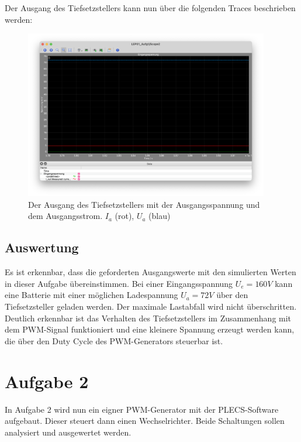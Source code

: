 \documentclass{report}
\begin{document}
Der Ausgang des Tiefsetzstellers kann nun über die folgenden Traces beschrieben werden:

\begin{figure}[hbt!]
	\begin{center}
		\includegraphics[width=0.95\textwidth]{assets/img/aufg1_ausgang.png}
	\end{center}
	\caption{Der Ausgang des Tiefsetzstellers mit der Ausgangsspannung und dem Ausgangsstrom. $I_a$ (rot), $U_a$ (blau)}
	\label{fig:aufg1_ausgang}
\end{figure}

\subsection{Auswertung}

Es ist erkennbar, dass die geforderten Ausgangswerte mit den simulierten Werten in dieser Aufgabe übereinstimmen. Bei einer Eingangsspannung $U_e = 160V$ kann eine Batterie mit einer möglichen Ladespannung $U_a = 72V$ über den Tiefsetzsteller geladen werden. Der maximale Lastabfall wird nicht überschritten. Deutlich erkennbar ist das Verhalten des Tiefsetzstellers im Zusammenhang mit dem PWM-Signal funktioniert und eine kleinere Spannung erzeugt werden kann, die über den Duty Cycle des PWM-Generators steuerbar ist.
\newpage
\section{Aufgabe 2}

In Aufgabe 2 wird nun ein eigner PWM-Generator mit der PLECS-Software aufgebaut. Dieser steuert dann einen Wechselrichter. Beide Schaltungen sollen analysiert und ausgewertet werden.
\end{document}
